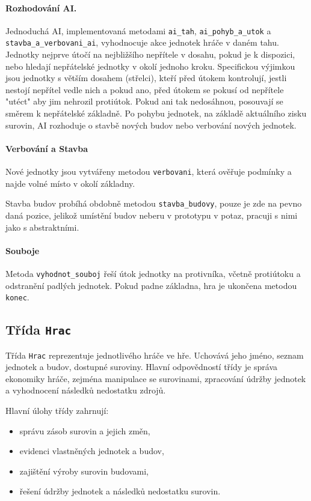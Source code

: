 \paragraph{Rozhodování AI.}  
Jednoduchá AI, implementovaná metodami \texttt{ai\_tah}, \texttt{ai\_pohyb\_a\_utok} a \texttt{stavba\_a\_verbovani\_ai}, vyhodnocuje akce jednotek hráče v daném tahu. Jednotky nejprve útočí na nejbližšího nepřítele v dosahu, pokud je k dispozici, nebo hledají nepřátelské jednotky v okolí jednoho kroku. Specifickou výjimkou jsou jednotky s větším dosahem (střelci), kteří před útokem kontrolují, jestli nestojí nepřítel vedle nich a pokud ano, před útokem se pokusí od nepřítele "utéct" aby jim nehrozil protiútok. Pokud ani tak nedosáhnou, posouvají se směrem k nepřátelské základně. Po pohybu jednotek, na základě aktuálního zisku surovin, AI rozhoduje o stavbě nových budov nebo verbování nových jednotek.

\paragraph{Verbování a Stavba}
Nové jednotky jsou vytvářeny metodou \texttt{verbovani}, která ověřuje podmínky a najde volné místo v okolí základny. 

Stavba budov probíhá obdobně metodou \texttt{stavba\_budovy}, pouze je zde na pevno daná pozice, jelikož umístění budov neberu v prototypu v potaz, pracuji 
s nimi jako s abstraktními.

\paragraph{Souboje}
Metoda \texttt{vyhodnot\_souboj} řeší útok jednotky na protivníka, včetně protiútoku a odstranění padlých jednotek. Pokud padne základna, hra je ukončena metodou \texttt{konec}.


\subsection{Třída \texttt{Hrac}}

Třída \texttt{Hrac} reprezentuje jednotlivého hráče ve hře. Uchovává jeho jméno, seznam jednotek a budov, dostupné suroviny. Hlavní odpovědností třídy je správa ekonomiky hráče, zejména manipulace se surovinami, zpracování údržby jednotek a vyhodnocení následků nedostatku zdrojů.

Hlavní úlohy třídy zahrnují: 
\begin{itemize} 
    \item správu zásob surovin a jejich změn, 
    \item evidenci vlastněných jednotek a budov, 
    \item zajištění výroby surovin budovami, 
    \item řešení údržby jednotek a následků nedostatku surovin. 
\end{itemize}

